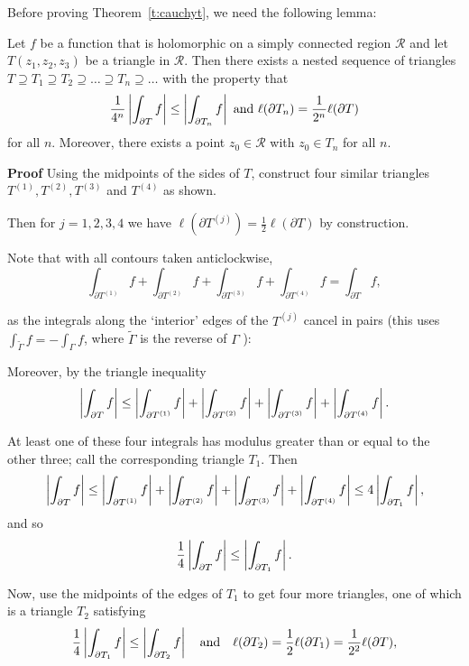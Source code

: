 Before proving Theorem~\ref{t:cauchyt}, we need the following lemma:
\begin{lemma}
\label{l:cauchyt}
Let $f$ be a function that is holomorphic on a simply connected region $\mathcal{R}$ and let $T(z_1,z_2,z_3)$ be a triangle in $\mathcal{R}$.  Then there exists a nested sequence of triangles $T \supseteq T_1 \supseteq T_2 \supseteq \ldots \supseteq T_n \supseteq \ldots$ with the property that
\[
\frac{1}{4^n} \left|  \int_{\partial T} f  \right| \leq \left|  \int_{\partial T_n} f  \right| \text{ and } \ell ( \partial T_n) = \frac{1}{2^n} \ell ( \partial T)
\]
for all $n$. Moreover, there exists a point $z_0 \in \mathcal{R}$ with $z_0 \in T_n$ for all $n$.
\end{lemma}
{\bf Proof }
 Using the midpoints of the sides of $T$, construct four similar triangles $T^{(1)},T^{(2)},T^{(3)}$ and $T^{(4)}$ as shown.

\begin{blankbox}
\begin{center}
\end{center}
Then for $j=1,2,3,4$ we have $\ell(\partial T^{(j)}) = \frac{1}{2} \ell ( \partial T)$ by construction.



Note that with all contours taken anticlockwise,
\[
\int_{\partial T^{(1)}} f + \int_{\partial T^{(2)} } f + \int_{\partial T^{(3)}} f + \int_{\partial T^{(4)}} f = \int_{\partial T} f,
\]

as the integrals along the `interior' edges of the $T^{(j)}$ cancel in pairs (this uses $\int_{\tilde{\Gamma}} f = - \int_{\Gamma} f$, where $\tilde{\Gamma}$ is the reverse of $\Gamma$ ):
\begin{center}
\end{center}
\end{blankbox}
Moreover, by the triangle inequality
\[
\left| \int_{\partial T} f \right| \leq \left|  \int_{\partial T^{(1)}} f \right| + \left| \int_{\partial T^{(2)} } f  \right|+ \left| \int_{\partial T^{(3)}} f  \right|+ \left| \int_{\partial T^{(4)}} f  \right|. 
\]
\begin{blankbox}
At least one of these four integrals has modulus greater than or equal to the other three; call the corresponding triangle $T_1$.  Then
\[
\left| \int_{\partial T} f \right| \leq \left|  \int_{\partial T^{(1)}} f \right| + \left| \int_{\partial T^{(2)} } f  \right|+ \left| \int_{\partial T^{(3)}} f  \right|+ \left| \int_{\partial T^{(4)}} f  \right| \leq 4 \left|  \int_{\partial T_1} f \right|,
\]
and so
\[
\frac{1}{4} \left|  \int_{\partial T } f  \right| \leq \left| \int_{\partial T_1} f \right|.
\]
\end{blankbox}
Now, use the midpoints of the edges of $T_1$ to get four more triangles, one of which is a triangle $T_2$ satisfying
\[
\frac{1}{4} \left|  \int_{\partial T_1} f  \right| \leq \left|  \int_{\partial T_2} f  \right| \quad\text{and}\quad \ell ( \partial T_2) = \frac{1}{2} \ell ( \partial T_1) = \frac{1}{2^2} \ell(\partial T),
\]

